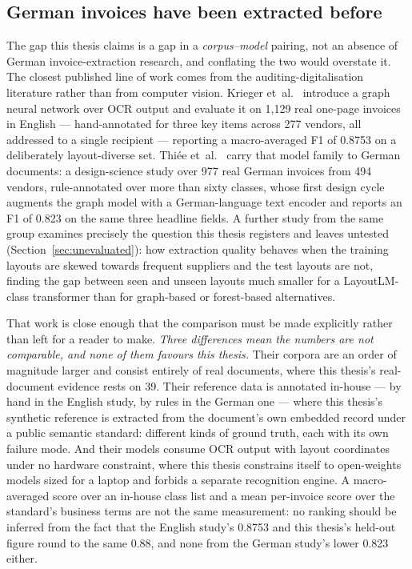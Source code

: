 \subsection{German invoices have been extracted before}
\label{sec:rw-german}

The gap this thesis claims is a gap in a \emph{corpus--model} pairing, not an absence of
German invoice-extraction research, and conflating the two would overstate it. The closest
published line of work comes from the auditing-digitalisation literature rather than from
computer vision. Krieger et~al.\ \parencite{krieger2021german} introduce a graph neural network over
\ac{OCR} output and evaluate it on 1,129 real one-page invoices in English ---
hand-annotated for three key items across 277 vendors, all addressed to a single recipient
--- reporting a macro-averaged \ac{F1} of 0.8753 on a deliberately layout-diverse set.
Thiée et~al.\ \parencite{thiee2023invoices} carry that model family to German documents: a design-science
study over 977 real German invoices from 494 vendors, rule-annotated over more than sixty
classes, whose first design cycle augments the graph model with a German-language text
encoder and reports an \ac{F1} of 0.823 on the same three headline fields. A further study
from the same group \parencite{krieger2023longtail} examines precisely the question this
thesis registers and leaves untested (Section~\ref{sec:unevaluated}): how extraction quality
behaves when the training layouts are skewed towards frequent suppliers and the test
layouts are not, finding the gap between seen and unseen layouts much smaller for a
LayoutLM-class transformer than for graph-based or forest-based alternatives.

That work is close enough that the comparison must be made explicitly rather than left for
a reader to make. \emph{Three differences mean the numbers are not comparable, and none of
them favours this thesis.} Their corpora are an order of magnitude larger and consist
entirely of real documents, where this thesis's real-document evidence rests on 39. Their
reference data is annotated in-house --- by hand in the English study, by rules in the
German one --- where this thesis's synthetic reference is extracted from the document's own
embedded record under a public semantic standard: different kinds of ground truth, each
with its own failure mode. And their models consume \ac{OCR} output with layout coordinates
under no hardware constraint, where this thesis constrains itself to open-weights models
sized for a laptop and forbids a separate recognition engine. A macro-averaged score over
an in-house class list and a mean per-invoice score over the standard's business terms are
not the same measurement: no ranking should be inferred from the fact that the English
study's 0.8753 and this thesis's held-out figure round to the same 0.88, and none from the
German study's lower 0.823 either.

